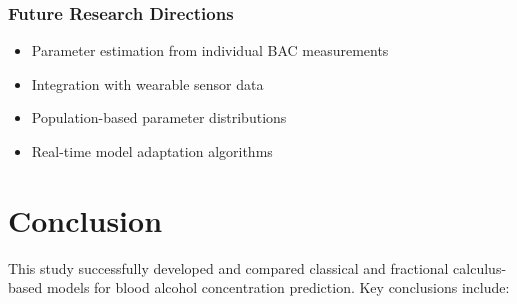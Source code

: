\documentclass[12pt]{article}
\begin{document}
\subsubsection{Future Research Directions}
\begin{itemize}
    \item Parameter estimation from individual BAC measurements
    \item Integration with wearable sensor data
    \item Population-based parameter distributions
    \item Real-time model adaptation algorithms
\end{itemize}

\section{Conclusion}

This study successfully developed and compared classical and fractional calculus-based models for blood alcohol concentration prediction. Key conclusions include:
\end{document}
